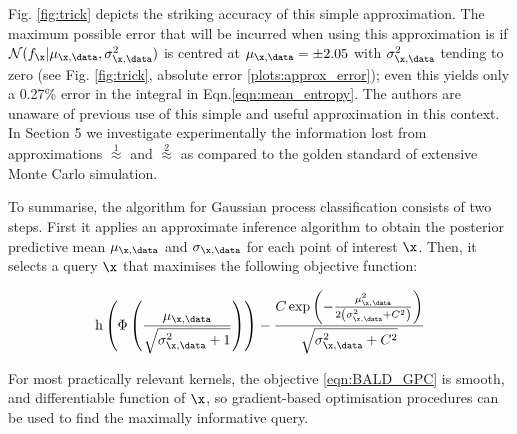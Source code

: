 Fig. \ref{fig:trick} depicts the striking accuracy of this simple approximation. The maximum possible error that will be incurred when using this approximation is if $\mathcal{N}(f_{\x}\vert \mu_{\x,\data},\sigma_{\x,\data}^2)$ is centred at $\mu_{\x,\data}=\pm 2.05$  with $\sigma_{\x,\data}^2$ tending to zero (see Fig. \ref{fig:trick}, absolute error \ref{plots:approx_error}); even this yields only a 0.27\% error in the integral in Eqn.\eqref{eqn:mean_entropy}. The authors are unaware of previous use of this simple and useful approximation in this context.  In Section 5 we investigate experimentally the information lost from approximations {\scriptsize $\stackrel{1}{\approx}$} and {\scriptsize $\stackrel{2}{\approx}$} as compared to the golden standard of extensive Monte Carlo simulation.

To summarise, the \ourmethod algorithm for Gaussian process classification consists of two steps. First it applies an approximate inference algorithm to obtain the posterior predictive mean $\mu_{\x,\data}$ and $\sigma_{\x,\data}$ for each point of interest $\x$. Then, it selects a query $\x$ that maximises the following objective function:

\begin{equation}
	\mathrm{h} \left( \Phi\left( \frac{\mu_{\x,\data}}{\sqrt{\sigma^2_{\x,\data} + 1}} \right)\right) - \frac{C \exp\left(-\frac{\mu_{\x,\data}^2}{2\left(\sigma_{\x,\data}^2 + C^2\right)}\right)}{\sqrt{\sigma_{\x,\data}^2 + C^2}} \label{eqn:BALD_GPC}
\end{equation}

For most practically relevant kernels, the objective \eqref{eqn:BALD_GPC} is smooth, and differentiable function of $\x$, so gradient-based optimisation procedures can be used to find the maximally informative query.

